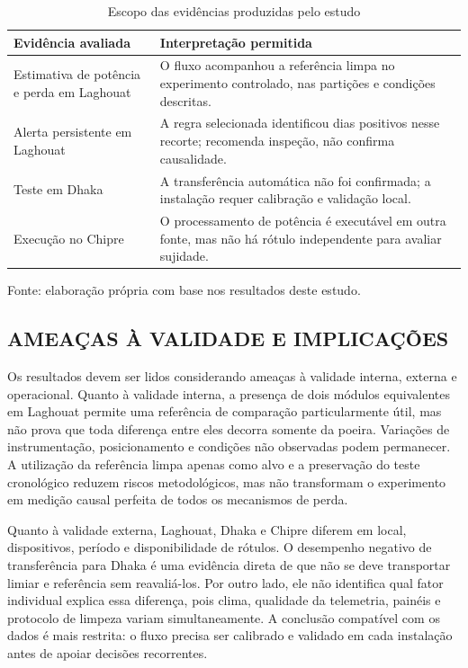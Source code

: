 \documentclass{UNESC}
\begin{document}
\begin{table}[htbp]
\centering
\caption{Escopo das evidências produzidas pelo estudo}
\label{tab:escopo-evidencias}
\small
\begin{tabularx}{\linewidth}{@{}>{\raggedright\arraybackslash}p{3.7cm}>{\raggedright\arraybackslash}X@{}}
\toprule
Evidência avaliada & Interpretação permitida \\
\midrule
Estimativa de potência e perda em Laghouat & O fluxo acompanhou a referência limpa no experimento controlado, nas partições e condições descritas. \\
Alerta persistente em Laghouat & A regra selecionada identificou dias positivos nesse recorte; recomenda inspeção, não confirma causalidade. \\
Teste em Dhaka & A transferência automática não foi confirmada; a instalação requer calibração e validação local. \\
Execução no Chipre & O processamento de potência é executável em outra fonte, mas não há rótulo independente para avaliar sujidade. \\
\bottomrule
\end{tabularx}
\par\smallskip\raggedright\footnotesize Fonte: elaboração própria com base nos resultados deste estudo.
\end{table}

\subsection{AMEAÇAS À VALIDADE E IMPLICAÇÕES}

Os resultados devem ser lidos considerando ameaças à validade interna, externa e operacional. Quanto à validade interna, a presença de dois módulos equivalentes em Laghouat permite uma referência de comparação particularmente útil, mas não prova que toda diferença entre eles decorra somente da poeira. Variações de instrumentação, posicionamento e condições não observadas podem permanecer. A utilização da referência limpa apenas como alvo e a preservação do teste cronológico reduzem riscos metodológicos, mas não transformam o experimento em medição causal perfeita de todos os mecanismos de perda.

Quanto à validade externa, Laghouat, Dhaka e Chipre diferem em local, dispositivos, período e disponibilidade de rótulos. O desempenho negativo de transferência para Dhaka é uma evidência direta de que não se deve transportar limiar e referência sem reavaliá-los. Por outro lado, ele não identifica qual fator individual explica essa diferença, pois clima, qualidade da telemetria, painéis e protocolo de limpeza variam simultaneamente. A conclusão compatível com os dados é mais restrita: o fluxo precisa ser calibrado e validado em cada instalação antes de apoiar decisões recorrentes.
\end{document}
